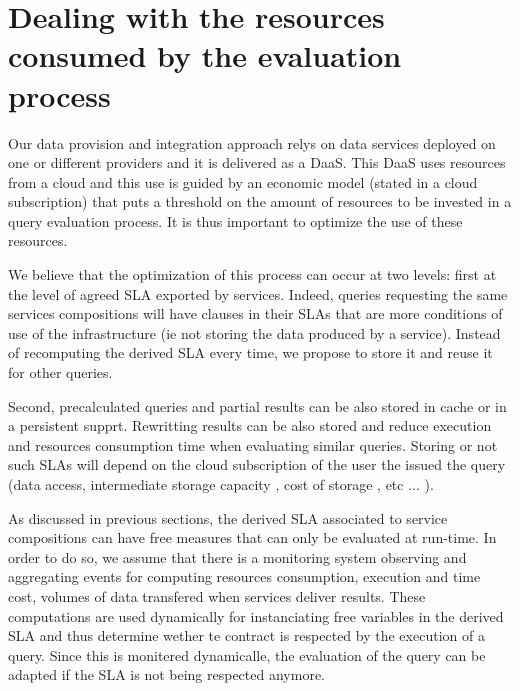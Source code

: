  
\section{Dealing with the resources consumed by the evaluation process}
\label{sec:queryProcessOpt}
 Our data provision and integration approach relys on data services deployed on one or different providers and it is delivered as a DaaS. This DaaS  uses resources from a cloud and this use  is  guided by an economic model (stated in a cloud subscription) that puts a threshold on the amount of resources to be invested in a query evaluation process. It is thus important to optimize the use of these resources.
 
 We believe that the optimization of this process can occur at two levels: first at the level of agreed SLA exported by services.  Indeed, queries requesting the same services compositions will have clauses in their SLAs that are more conditions of use of the infrastructure (ie not storing the data produced by a service). Instead of recomputing the derived SLA every time, we propose to store it and reuse it for other queries. 
 
Second, precalculated queries and partial results can be also stored in cache or in a persistent supprt. Rewritting results can be also stored and reduce execution and resources consumption time when evaluating similar queries. Storing or not such SLAs will depend on the cloud subscription of the user the issued the query (data access, intermediate storage capacity , cost of storage , etc ... ).

As discussed in previous sections, the derived SLA associated to service compositions can have free measures that can only be evaluated at run-time. In order to do so, we assume that there is a monitoring system observing and aggregating events for computing resources consumption, execution and time cost, volumes of data transfered when services deliver results. These computations are used dynamically for instanciating free variables in the derived SLA and thus determine wether te contract is respected by the execution of a query. Since this is monitered dynamicalle, the evaluation of the query can be adapted if the SLA is not being respected anymore.

